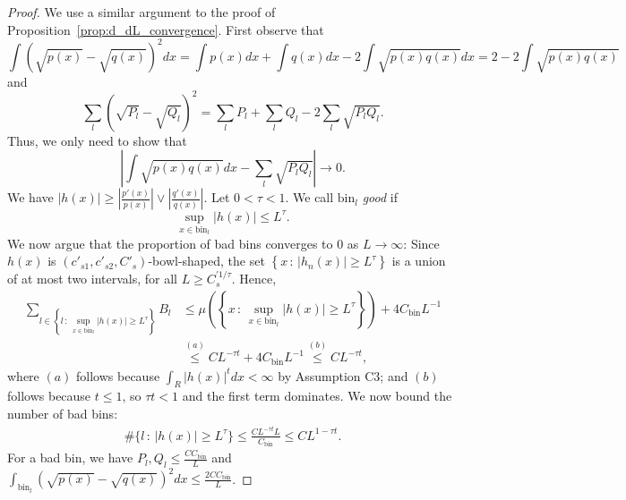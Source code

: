 \documentclass{article}
\newcommand{\bin}{\text{bin}}
\begin{document}
\begin{proof}
We use a similar argument to the proof of Proposition~\ref{prop:d_dL_convergence}. First observe that
\begin{equation*}
\int (\sqrt{p(x)} - \sqrt{q(x)})^2 dx = \int p(x) dx + \int q(x) dx - 2 \int \sqrt{p(x)q(x)} dx = 2 - 2 \int \sqrt{p(x)q(x)}
\end{equation*}
and
\begin{equation*}
\sum_l (\sqrt{P_l} - \sqrt{Q_l})^2 = \sum_l P_l + \sum_l Q_l - 2 \sum_l \sqrt{P_l Q_l}.
\end{equation*}
Thus, we only need to show that 
\[
\left| \int \sqrt{p(x)q(x)} dx - \sum_l \sqrt{P_l Q_l} \right| \rightarrow 0.
\]
We have $|h(x)| \geq \left| \frac{p'(x)}{p(x)} \right| \vee \left| \frac{q'(x)}{q(x)} \right|$. Let $0 < \tau < 1$. We call $\bin_l$ \emph{good} if
$$
\sup_{x \in \bin_l} |h(x)| \leq L^\tau.
$$
We now argue that the proportion of bad bins converges to 0 as $L \rightarrow \infty$: Since $h(x)$ is $(c'_{s1}, c'_{s2}, C'_s)$-bowl-shaped, the set $\left \{x \,:\, |h_n(x)|  \geq L^\tau \right \}$ is a union of at most two intervals, for all $L \geq C_s^{\prime 1/\tau}$. Hence,
\begin{align*}
\sum_{l \in \left \{ l \,:\, \sup_{x \in \bin_l} |h(x)| 
           \geq L^\tau \right \}}  B_l &\leq 
   \mu \left( \left\{x \,:\, \sup_{x \in \bin_l} |h(x)|
         \geq L^\tau \right\} \right) + 4 C_\bin L^{-1} \\
  &\stackrel{(a)} \leq C L^{-\tau t}  + 4 C_\bin L^{-1} \stackrel{(b)}{\leq} C L^{ - \tau t},
\end{align*}
where $(a)$ follows because $\int_R |h(x)|^t dx < \infty$ by Assumption C3; and $(b)$ follows because $t \leq 1$, so $\tau t < 1$ and the first term dominates. We now bound the number of bad bins: 
\begin{align*}
\# \{ l \,:\, |h(x)| \geq L^\tau \} \leq \frac{C L^{- \tau t} L}{C_\bin}  \leq C L^{1 - \tau t}.
\end{align*}
For a bad bin, we have $P_l, Q_l \leq \frac{C C_\bin}{L}$ and $\int_{\bin_l} (\sqrt{p(x)} - \sqrt{q(x)})^2 dx \leq \frac{2CC_\bin}{L}$.


\end{proof}
\end{document}
